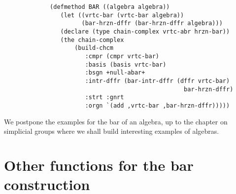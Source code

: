 {\footnotesize\begin{verbatim}
             (defmethod BAR ((algebra algebra))
                (let ((vrtc-bar (vrtc-bar algebra))
                      (bar-hrzn-dffr (bar-hrzn-dffr algebra)))
                (declare (type chain-complex vrtc-abr hrzn-bar))
                (the chain-complex
                    (build-chcm
                       :cmpr (cmpr vrtc-bar)
                       :basis (basis vrtc-bar)
                       :bsgn +null-abar+
                       :intr-dffr (bar-intr-dffr (dffr vrtc-bar)
                                                   bar-hrzn-dffr)
                       :strt :gnrt
                       :orgn `(add ,vrtc-bar ,bar-hrzn-dffr)))))
\end{verbatim}}
We postpone the examples for the bar of an algebra, up to the chapter on
simplicial groups where we shall  build interesting examples of algebras.


\newpage

\section {Other functions for the bar construction}

